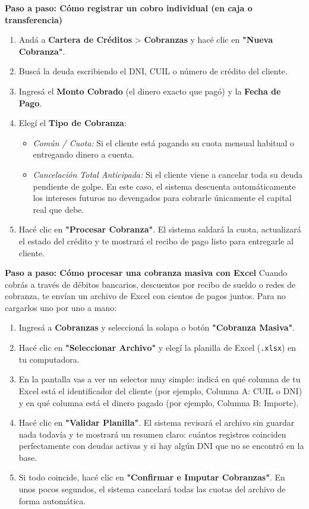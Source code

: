 \documentclass[12pt,a4paper]{article}
\renewcommand{\_}{\textunderscore\allowbreak}
\begin{document}
\textbf{Paso a paso: Cómo registrar un cobro individual (en caja o transferencia)}
\begin{enumerate}
    \item Andá a \textbf{Cartera de Créditos} > \textbf{Cobranzas} y hacé clic en \textbf{"Nueva Cobranza"}.
    \item Buscá la deuda escribiendo el DNI, CUIL o número de crédito del cliente.
    \item Ingresá el \textbf{Monto Cobrado} (el dinero exacto que pagó) y la \textbf{Fecha de Pago}.
    \item Elegí el \textbf{Tipo de Cobranza}:
          \begin{itemize}
              \item \textit{Común / Cuota:} Si el cliente está pagando su cuota mensual habitual o entregando dinero a cuenta.
              \item \textit{Cancelación Total Anticipada:} Si el cliente viene a cancelar toda su deuda pendiente de golpe. En este caso, el sistema descuenta automáticamente los intereses futuros no devengados para cobrarle únicamente el capital real que debe.
          \end{itemize}
    \item Hacé clic en \textbf{"Procesar Cobranza"}. El sistema saldará la cuota, actualizará el estado del crédito y te mostrará el recibo de pago listo para entregarle al cliente.
\end{enumerate}

\textbf{Paso a paso: Cómo procesar una cobranza masiva con Excel}
Cuando cobrás a través de débitos bancarios, descuentos por recibo de sueldo o redes de cobranza, te envían un archivo de Excel con cientos de pagos juntos. Para no cargarlos uno por uno a mano:
\begin{enumerate}
    \item Ingresá a \textbf{Cobranzas} y seleccioná la solapa o botón \textbf{"Cobranza Masiva"}.
    \item Hacé clic en \textbf{"Seleccionar Archivo"} y elegí la planilla de Excel (\texttt{.xlsx}) en tu computadora.
    \item En la pantalla vas a ver un selector muy simple: indicá en qué columna de tu Excel está el identificador del cliente (por ejemplo, Columna A: CUIL o DNI) y en qué columna está el dinero pagado (por ejemplo, Columna B: Importe).
    \item Hacé clic en \textbf{"Validar Planilla"}. El sistema revisará el archivo sin guardar nada todavía y te mostrará un resumen claro: cuántos registros coinciden perfectamente con deudas activas y si hay algún DNI que no se encontró en la base.
    \item Si todo coincide, hacé clic en \textbf{"Confirmar e Imputar Cobranzas"}. En unos pocos segundos, el sistema cancelará todas las cuotas del archivo de forma automática.
\end{enumerate}
\end{document}
